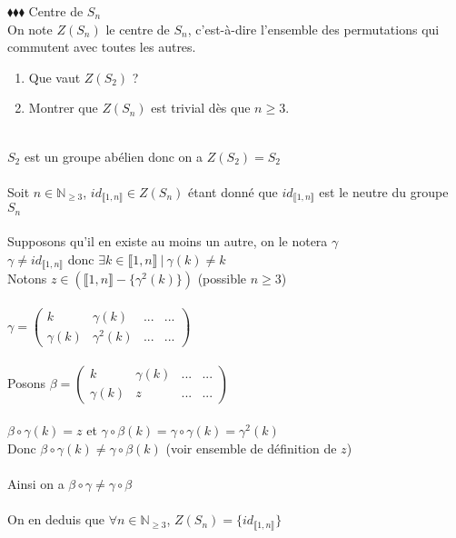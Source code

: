\documentclass[11pt]{article}
\newcommand*{\N}{\mathbb{N}}
\newcommand{\0}{\varnothing}
\begin{document}
\begin{exercise}{$\blacklozenge\blacklozenge\blacklozenge$}{}
    Centre de $S_{n}$\\
    On note $Z(S_{n})$ le centre de $S_{n}$, c'est-à-dire l'ensemble des permutations qui commutent avec toutes les autres.\\
    \begin{enumerate}
        \item Que vaut $Z(S_{2})$ ?
        \item Montrer que $Z(S_{n})$ est trivial dès que $n \geq 3$.
    \end{enumerate}
    \tcblower\\[0.2cm]
     $S_{2}$ est un groupe abélien donc on a $Z(S_{2}) = S_{2}$\\\\
     Soit $n \in \N_{\geq 3}$, $id_{\llbracket 1, n \rrbracket} \in Z(S_{n})$ étant donné que $id_{\llbracket 1, n \rrbracket}$ est le neutre du groupe $S_{n}$\\\\
    Supposons qu'il en existe au moins un autre, on le notera $\gamma$\\
    $\gamma \neq id_{\llbracket 1, n \rrbracket}$ donc $\exists k \in \llbracket 1, n \rrbracket ~|~ \gamma(k) \neq k$\\
    Notons $z \in (\llbracket 1, n \rrbracket - \{\gamma^{2}(k)\})$ (possible $n \geq 3$) \\\\
    $\gamma = \begin{pmatrix}
        k & \gamma(k) & ... & ... \\
        \gamma(k) & \gamma^{2}(k) & ... & ...
    \end{pmatrix}$\\\\
    Posons $\beta = \begin{pmatrix}
        k & \gamma(k) & ... & ... \\
        \gamma(k) & z & ... & ...
    \end{pmatrix}$\\\\
    $\beta \circ \gamma(k) = z$ et $\gamma \circ \beta(k) = \gamma \circ \gamma(k) = \gamma^{2}(k)$\\
    Donc $\beta \circ \gamma(k) \neq \gamma \circ \beta(k)$ (voir ensemble de définition de $z$)\\\\
    Ainsi on a $\beta \circ \gamma \neq \gamma \circ \beta$\\\\
    On en deduis que $\forall n \in \N_{\geq 3}$, $Z(S_{n}) = \{ id_{\llbracket 1, n \rrbracket} \}$
\end{exercise}
\end{document}
